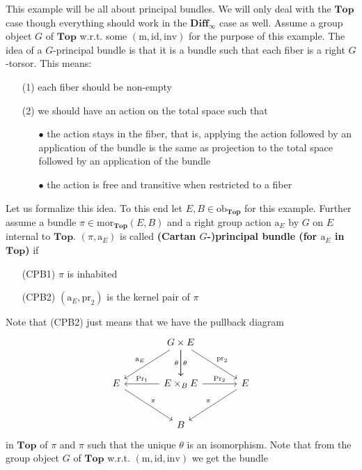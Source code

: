 \begin{exa}[Bundles 2]
\label{exa:bundles2}
This example will be all about principal bundles. We will only deal with the $\mathbf{Top}$ case though everything should work in the $\mathbf{Diff}_{\infty}$ case as well. Assume a group object $G$ of $\mathbf{Top}$ w.r.t. some $(\mathrm{m},\mathrm{id},\mathrm{inv})$ for the purpose of this example. The idea of a $G$-principal bundle is that it is a bundle such that each fiber is a right $G$-torsor. This means:
\begin{enumerate}
\item[(1)]
each fiber should be non-empty
\item[(2)]
we should have an action on the total space such that
\begin{enumerate}
\item[$\bullet$]
the action stays in the fiber, that is, applying the action followed by an application of the bundle is the same as projection to the total space followed by an application of the bundle
\item[$\bullet$]
the action is free and transitive when restricted to a fiber
\end{enumerate}
\end{enumerate}
Let us formalize this idea. To this end let $E,B \in \mathrm{ob}_{\mathbf{Top}}$ for this example. Further assume a bundle $\pi \in \mathrm{mor}_{\mathbf{Top}}(E,B)$ and a right group action $\mathrm{a}_{E}$ by $G$ on $E$ internal to $\mathbf{Top}$. $(\pi,\mathrm{a}_{E})$ is called \textbf{(Cartan $G$-)principal bundle (for $\mathrm{a}_{E}$ in $\mathbf{Top}$)} if
\begin{enumerate}
\item[(CPB1)]
$\pi$ is inhabited
\item[(CPB2)]
$(\mathrm{a}_{E},\mathrm{pr}_{2})$ is the kernel pair of $\pi$
\end{enumerate}
Note that (CPB2) just means that we have the pullback diagram
\[
\begin{tikzcd}[sep=large]
  &
  G
  \times
  E
  \arrow{dr}{\mathrm{pr}_{2}}
  \arrow{d}{\theta}
  \arrow[swap]{d}{\theta}
  \arrow[swap]{dl}{\mathrm{a}_{E}}
  &
  \\
  E
  \arrow{dr}{\pi}
  &
  E
  \times_{B}
  E
  \arrow{r}{\mathrm{Pr}_{2}}
  \arrow[swap]{l}{\mathrm{Pr}_{1}}
  &
  E
  \arrow[swap]{dl}{\pi}
  \\
  &
  B
  &
\end{tikzcd}
\]
in $\mathbf{Top}$ of $\pi$ and $\pi$ such that the unique $\theta$ is an isomorphism. Note that from the group object $G$ of $\mathbf{Top}$ w.r.t. $(\mathrm{m},\mathrm{id},\mathrm{inv})$ we get the bundle

\end{exa}
